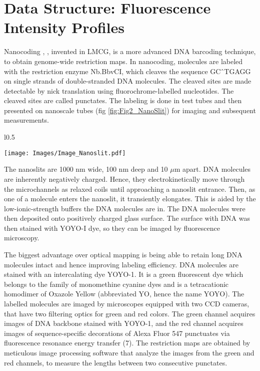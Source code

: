 \chapter{Data Structure: Fluorescence Intensity Profiles}

Nanocoding \cite{Jo_etal_2007_PNAS}, \cite{Jo_etal_2009}, invented in LMCG, is a more advanced DNA barcoding technique, to obtain genome-wide restriction maps. In nanocoding, molecules are labeled with the restriction enzyme Nb.BbvCI, which cleaves the sequence GC\^\ TGAGG on single strands of double-stranded DNA molecules. The cleaved sites are made detectable by nick translation using fluorochrome-labelled nucleotides. The cleaved sites are called punctates. The labeling is done in test tubes and then presented on nanoscale tubes (fig \ref{fig:Fig2_NanoSlit}) for imaging and subsequent measurements. 
\begin{wrapfigure}{l}{0.5\textwidth}
\begin{center}
\texttt{[image: Images/Image\_Nanoslit.pdf]}
\end{center}
\caption{Nanoslits where DNA molecules are presented}
\label{fig:Fig2_NanoSlit}
\end{wrapfigure}
The nanoslits are 1000 nm wide, 100 nm deep and 10 $\mu$m apart. DNA molecules are inherently negatively charged. Hence, they electrokinetically move through the microchannels as relaxed coils until approaching a nanoslit entrance. Then, as one of a molecule enters the nanoslit, it transiently elongates. This is aided by the low-ionic-strength buffers the DNA molecules are in. The DNA molecules were then deposited onto positively charged glass surface. The surface with DNA was then stained with YOYO-I dye, so they can be imaged by fluorescence microscopy. 

The biggest advantage over optical mapping is being able to retain long DNA molecules intact and hence improving labeling efficiency. DNA molecules are stained with an intercalating dye YOYO-1. It is a green fluorescent dye which belongs to the family of monomethine cyanine dyes and is a tetracationic homodimer of Oxazole Yellow (abbreviated YO, hence the name YOYO). The labelled molecules are imaged by microscopes equipped with two CCD cameras, that have two filtering optics for green and red colors. The green channel acquires images of DNA backbone stained with YOYO-1, and the red channel acquires images of sequence-specific decorations of Alexa Fluor 547 punctuates via fluorescence resonance energy transfer (7). The restriction maps are obtained by meticulous image processing software that analyze the images from the green and red channels, to measure the lengths between two consecutive punctates.  \\



